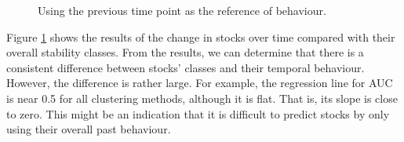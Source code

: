 \begin{figure}[!h]
{\begin{minipage}{\dimexpr \textwidth-2\fboxsep-2\fboxrule}
    \end{minipage}}
    \caption{Using the previous time point as the reference of behaviour.}
    \label{fig:ChangeMeasuers_Cons_Stock}
\end{figure}

Figure \ref{fig:ChangeMeasuers_Cons_Stock} shows the results of the change in stocks over time compared with their overall stability classes. From the results, we can determine that there is a consistent difference between stocks' classes and their temporal behaviour. However, the difference is rather large. For example, the regression line for AUC is near 0.5 for all clustering methods, although it is flat. That is, its slope is close to zero.  This might be an indication that it is difficult to predict stocks by only using their overall past behaviour.


